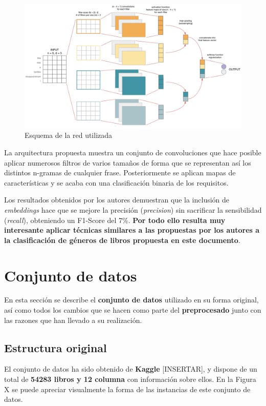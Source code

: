 \documentclass[12pt,a4paper, xcolor=table]{article}
\begin{document}
  \begin{figure}[!h]
    \centering
    \includegraphics[width=450px]{img/CNN Word2vect.png}
    \caption{Esquema de la red utilizada}
    \end{figure}

\vspace{3mm}

La arquitectura propuesta muestra un conjunto de convoluciones que hace posible aplicar numerosos filtros de varios tamaños de forma que se representan así los distintos n-gramas de cualquier frase. Posteriormente se aplican mapas de características y se acaba con una clasificación binaria de los requisitos.

\vspace{3mm}

Los resultados obtenidos por los autores demuestran que la inclusión de \textit{embeddings} hace que se mejore la precisión (\textit{precision}) sin sacrificar la sensibilidad (\textit{recall}), obteniendo un F1-Score del 7\%. \textbf{Por todo ello resulta muy interesante aplicar técnicas similares a las propuestas por los autores a la clasificación de géneros de libros propuesta en este documento}.

\newpage

\section{Conjunto de datos}
    En esta sección se describe el \textbf{conjunto de datos} utilizado en su forma original, así como todos los cambios que se hacen como parte del \textbf{preprocesado} junto con las razones que han llevado a su realización.

    \subsection{Estructura original}
    El conjunto de datos ha sido obtenido de \textbf{Kaggle} [INSERTAR], y dispone de un total de \textbf{54283 libros y 12 columna} con información sobre ellos. En la Figura X se puede apreciar visualmente la forma de las instancias de este conjunto de datos.
\end{document}
